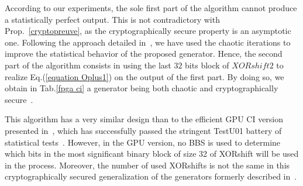 According to our experiments, the sole first part of the algorithm cannot 
produce a statistically perfect output. This is not contradictory with
Prop.~\ref{cryptopreuve}, as the cryptographically secure property
is an asymptotic one.
Following the approach detailed in~\cite{bfg12a:ip}, 
we have used the chaotic iterations to improve the 
statistical behavior of the proposed generator.
Hence, the second part of the algorithm consists 
in using the last $32$ bits block of $XORshift2$ 
to realize Eq.(\ref{equation Oplus1}) on the output 
of the first part. 
By doing so, we obtain in 
Tab.\ref{fpga ci} a generator being
both chaotic and cryptographically secure~\cite{DBLP:journals/corr/abs-1112-5239}.

This algorithm has a very similar design than to the efficient GPU CI version
presented in~\cite{DBLP:journals/corr/abs-1112-5239}, which has 
successfully passed the stringent TestU01 battery of statistical 
tests~\cite{Lecuyer2009}.
However, in the GPU version, no BBS is used to determine which bits
in the most significant binary block of size 32 of XORshift
will be used in the process. Moreover, the number of used XORshifts
is not the same in this cryptographically secured generalization 
of the generators formerly described in~\cite{DBLP:journals/corr/abs-1112-5239}. 
